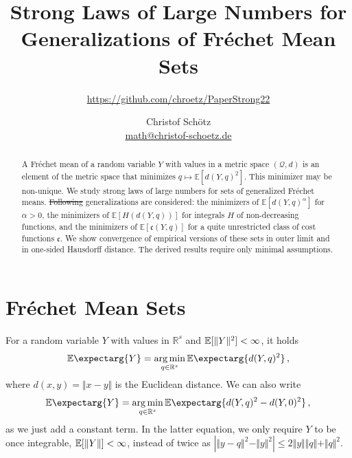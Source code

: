 \documentclass{scrartcl}
\newcommand{\Eof}[1]{\E[#1]}
\newcommand{\Ex}{\E\expectarg}
\newcommand*{\mf}[1]{\mathfrak{#1}}
\newcommand{\R}{\mathbb{R}}
\newcommand{\normof}[1]{\Vert #1 \Vert}
\newcommand{\equationComma}{\, ,}
\newcommand{\eqcm}{\equationComma}
\DeclareMathOperator*{\argmin}{arg\,min}
\theoremstyle{plain}\newtheorem{theorem}{Theorem}[section]
\theoremstyle{definition}
\theoremstyle{remark}
\providecommand{\DIFaddtex}[1]{{\protect\color{blue}\uwave{#1}}} %
\providecommand{\DIFdeltex}[1]{{\protect\color{red}\sout{#1}}}                      %
\providecommand{\DIFaddbegin}{} %
\providecommand{\DIFaddend}{} %
\providecommand{\DIFdelbegin}{} %
\providecommand{\DIFdelend}{} %
\providecommand{\DIFadd}[1]{\texorpdfstring{\DIFaddtex{#1}}{#1}} %
\providecommand{\DIFdel}[1]{\texorpdfstring{\DIFdeltex{#1}}{}} %
\newcommand{\DIFscaledelfig}{0.5}
\newlength{\DIFdelgraphicswidth} %
\newlength{\DIFdelgraphicsheight} %
\newcommand{\DIFaddincludegraphics}[2][]{{\color{blue}\fbox{\DIFOincludegraphics[#1]{#2}}}} %
\newcommand{\DIFdelincludegraphics}[2][]{%
\sbox{\DIFdelgraphicsbox}{\DIFOincludegraphics[#1]{#2}}%
\settoboxwidth{\DIFdelgraphicswidth}{\DIFdelgraphicsbox} %
\settoboxtotalheight{\DIFdelgraphicsheight}{\DIFdelgraphicsbox} %
\scalebox{\DIFscaledelfig}{%
\parbox[b]{\DIFdelgraphicswidth}{\usebox{\DIFdelgraphicsbox}\\[-\baselineskip] \rule{\DIFdelgraphicswidth}{0em}}\llap{\resizebox{\DIFdelgraphicswidth}{\DIFdelgraphicsheight}{%
\setlength{\unitlength}{\DIFdelgraphicswidth}%
\begin{picture}(1,1)%
\thicklines\linethickness{2pt} %
{\color[rgb]{1,0,0}\put(0,0){\framebox(1,1){}}}%
{\color[rgb]{1,0,0}\put(0,0){\line( 1,1){1}}}%
{\color[rgb]{1,0,0}\put(0,1){\line(1,-1){1}}}%
\end{picture}%
}\hspace*{3pt}}} %
} %
\DeclareRobustCommand{\DIFaddbegin}{\DIFOaddbegin \let\includegraphics\DIFaddincludegraphics} %
\DeclareRobustCommand{\DIFaddend}{\DIFOaddend \let\includegraphics\DIFOincludegraphics} %
\DeclareRobustCommand{\DIFdelbegin}{\DIFOdelbegin \let\includegraphics\DIFdelincludegraphics} %
\DeclareRobustCommand{\DIFdelend}{\DIFOaddend \let\includegraphics\DIFOincludegraphics} %
\begin{document}
\title{Strong Laws of Large Numbers for Generalizations of Fréchet Mean Sets}
\subtitle{\url{https://github.com/chroetz/PaperStrong22}}
\author{Christof Schötz\\\href{mailto:math@christof-schoetz.de}{math@christof-schoetz.de}}
\date{}
\maketitle
\begin{abstract} 
A Fréchet mean of a random variable $Y$ with values in a metric space $(\mathcal Q, d)$ is an element of the metric space that minimizes $q \mapsto \mathbb E[d(Y,q)^2]$. This minimizer may be non-unique. 
We study strong laws of large numbers for sets of generalized Fréchet means.
\DIFdelbegin \DIFdel{Following }\DIFdelend \DIFaddbegin \DIFadd{The following }\DIFaddend generalizations are considered: 
the minimizers of $\mathbb E[d(Y, q)^\alpha]$ for $\alpha > 0$,
the minimizers of $\mathbb E[H(d(Y, q))]$ for integrals $H$ of non-decreasing functions, and
the minimizers of $\mathbb E[\mathfrak c(Y, q)]$ for a quite unrestricted class of cost functions $\mf c$.
We show convergence of empirical versions of these sets in outer limit and in one-sided Hausdorff distance. The derived results require only minimal assumptions.
 \end{abstract}
\section{Fréchet Mean Sets}
For a random variable $Y$ with values in $\R^s$ and $\Eof{\normof{Y}^2}<\infty$, it holds
\begin{equation*}
	\Ex{Y} = \argmin_{q\in\R^s} \Ex{d(Y,q)^2}
	\eqcm
\end{equation*}
where $d(x,y) = \normof{x-y}$ is the Euclidean distance. We can also write 
\begin{equation*}
	\Ex{Y} = \argmin_{q\in\R^s} \Ex{d(Y,q)^2-d(Y,0)^2}
	\eqcm
\end{equation*}
as we just add a constant term. In the latter equation, we only require $Y$ to be once integrable, $\Eof{\normof{Y}}<\infty$, instead of twice as $|\normof{y-q}^2-\normof{y}^2| \leq 2\normof{y}\normof{q}+\normof{q}^2$.
\end{document}
